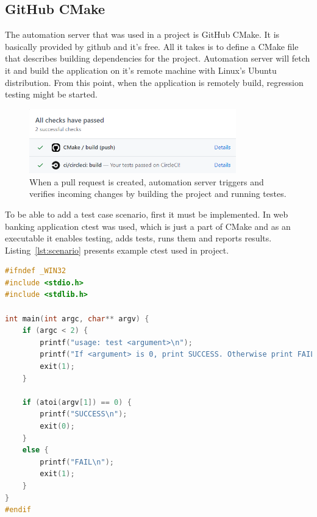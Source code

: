 \documentclass[a4paper,12pt]{book}
\newcommand\tab[1][1cm]{\hspace*{#1}}
\begin{document}
\subsection{GitHub CMake}
{
\tab The automation server that was used in a project is GitHub CMake. It is basically provided by github and it's free. All it takes is to define a CMake file that describes building dependencies for the project. Automation server will fetch it and build the application on it's remote machine with Linux's Ubuntu distribution. From this point, when the application is remotely build, regression testing might be started.

\begin{figure}[H]
  \centering
    \includegraphics[width=0.8\textwidth]{checks}
    \caption{When a pull request is created, automation server triggers and verifies incoming changes by building the project and running testes.}
    \label{fig:fivth}
\end{figure}

\bigskip To be able to add a test case scenario, first it must be implemented. In web banking application ctest was used, which is just a part of CMake and as an executable it enables testing, adds tests, runs them and reports results. Listing~\ref{lst:scenario} presents example ctest used in project.
    
\bigskip
\begin{lstlisting}[frame=single, label={lst:scenario}, basicstyle=\small, language=C++, caption={Example ctest file used in project. It is quite self-explanatory, if first input argument equals 0, the scenario prints 'SUCCESS' and exits with 0 status. Otherwise it prints 'FAIL' and exit with 1 status.}, captionpos=b, float]
#ifndef _WIN32
#include <stdio.h>
#include <stdlib.h>

int main(int argc, char** argv) {
    if (argc < 2) {
        printf("usage: test <argument>\n");
        printf("If <argument> is 0, print SUCCESS. Otherwise print FAIL.\n");
        exit(1);
    }

    if (atoi(argv[1]) == 0) {
        printf("SUCCESS\n");
        exit(0);
    }
    else {
        printf("FAIL\n");
        exit(1);
    }
}
#endif
\end{lstlisting}

}
\end{document}

